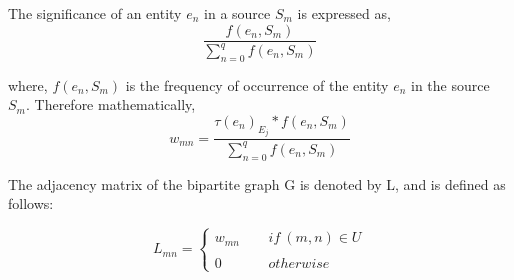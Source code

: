 The significance of an entity $e_{n}$ in a source $S_{m}$ is expressed as,
\begin{equation}
\frac{f(e_{n}, S_{m})}{\displaystyle\sum\limits_{n=0}^{q} {f(e_{n}, S_{m})} }
\end{equation}

\noindent where, $f(e_{n}, S_{m})$ is the frequency of occurrence of the entity $e_{n}$ in the source $S_{m}$. Therefore mathematically,
\begin{equation}
w_{mn} = \frac{\tau(e_{n})_{E_{j}}\ast f(e_{n}, S_{m}) }{\displaystyle\sum\limits_{n=0}^{q} f(e_{n}, S_{m}) }
\end{equation}

The adjacency matrix of the bipartite graph G is denoted by L, and is defined as follows:

\[
L_{mn} = \left\{ \begin{array}{ccc}
w_{mn} & ~~ & if\  (m,n)\in U \\\\
0 & ~~ & otherwise \end{array} \right.
\]

%
%





%
%

